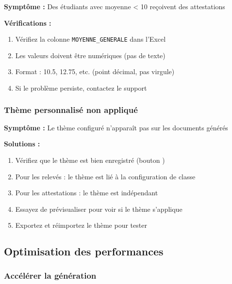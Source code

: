 \textbf{Symptôme :} Des étudiants avec moyenne < 10 reçoivent des attestations


\textbf{Vérifications :}
\begin{enumerate}[leftmargin=*]
    \item Vérifiez la colonne \texttt{MOYENNE\_GENERALE} dans l'Excel
    \item Les valeurs doivent être numériques (pas de texte)
    \item Format : 10.5, 12.75, etc. (point décimal, pas virgule)
    \item Si le problème persiste, contactez le support
\end{enumerate}

\subsubsection{Thème personnalisé non appliqué}

\textbf{Symptôme :} Le thème configuré n'apparaît pas sur les documents générés

\textbf{Solutions :}
\begin{enumerate}[leftmargin=*]
    \item Vérifiez que le thème est bien enregistré (bouton )
    \item Pour les relevés : le thème est lié à la configuration de classe
    \item Pour les attestations : le thème est indépendant
    \item Essayez de prévisualiser pour voir si le thème s'applique
    \item Exportez et réimportez le thème pour tester
\end{enumerate}

\subsection{Optimisation des performances}

\subsubsection{Accélérer la génération}

